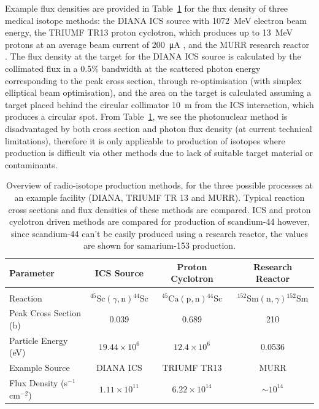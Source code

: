 \documentclass[../main.tex]{subfiles}
\begin{document}
Example flux densities are provided in Table~\ref{tab:example_isotope_cross_section_flux_density} for the flux density of three medical isotope methods: the DIANA ICS source with 1072~\si{\mega\electronvolt} electron beam energy, the TRIUMF TR13 proton cyclotron, which produces up to 13~\si{\mega\electronvolt} protons at an average beam current of 200~\si{\micro\ampere} \cite{hoehr2017medical,laxdale1994beam}, and the MURR research reactor \cite{ma1996production}. The flux density at the target for the DIANA ICS source is calculated by the collimated flux in a 0.5\% bandwidth at the scattered photon energy corresponding to the peak cross section, through re-optimisation (with simplex elliptical beam optimisation), and the area on the target is calculated assuming a target placed behind the circular collimator 10~\si{\meter} from the ICS interaction, which produces a circular spot. From Table~\ref{tab:example_isotope_cross_section_flux_density}, we see the photonuclear method is disadvantaged by both cross section and photon flux density (at current technical limitations), therefore it is only applicable to production of isotopes where production is difficult via other methods due to lack of suitable target material or contaminants.
\begin{table}[!h]
\centering
\caption{Overview of radio-isotope production methods, for the three possible processes at an example facility (DIANA, TRIUMF TR 13 and MURR). Typical reaction cross sections and flux densities of these methods are compared. ICS and proton cyclotron driven methods are compared for production of scandium-44 however, since scandium-44 can't be easily produced using a research reactor, the values are shown for samarium-153 production.}
\vspace{3mm}
\begin{tabular}{lccc}
\hline\hline
Parameter & ICS Source & Proton Cyclotron & Research Reactor \\
\hline
\multicolumn{4}{c}{\vspace{-4mm}}\\
Reaction & $^{45}\mathrm{Sc}\left(\gamma,\mathrm{n}\right){}^{44}\mathrm{Sc}$ & $^{45}\mathrm{Ca}\left(\mathrm{p},\mathrm{n}\right){}^{44}\mathrm{Sc}$ & $^{152}\mathrm{Sm}\left(\mathrm{n},\gamma\right){}^{152}\mathrm{Sm}$ \\
Peak Cross Section (\si{\barn}) & 0.039 \cite{veyssiere1974study} & 0.689 \cite{carzaniga2017measurement} &  210 \cite{ma1996production} \\
Particle Energy (\si{\electronvolt}) & $19.44\times 10^{6}$ & $12.4\times 10^{6}$ & 0.0536 \\
Example Source & DIANA ICS & TRIUMF TR13 \cite{hoehr2017medical,laxdale1994beam} & MURR \cite{ma1996production} \\
Flux Density (\si{\second}$^{-1}$\si{\centi\meter}$^{-2}$) & $1.11\times 10^{11}$ & $6.22\times 10^{14}$ & $\sim 10^{14}$ \\
\hline\hline
\end{tabular}
\label{tab:example_isotope_cross_section_flux_density}
\end{table}
\end{document}
